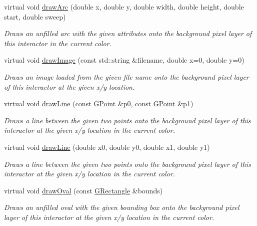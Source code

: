 \begin{DoxyCompactItemize}
virtual void \mbox{\hyperlink{classGDrawingSurface_a38b6fae1045191c57092b49905068144}{draw\+Arc}} (double x, double y, double width, double height, double start, double sweep)
\begin{DoxyCompactList}\small\item\em Draws an unfilled arc with the given attributes onto the background pixel layer of this interactor in the current color. \end{DoxyCompactList}\item 
virtual void \mbox{\hyperlink{classGDrawingSurface_abdd4cb1f2c64adc5d03522a1ee30febf}{draw\+Image}} (const std\+::string \&filename, double x=0, double y=0)
\begin{DoxyCompactList}\small\item\em Draws an image loaded from the given file name onto the background pixel layer of this interactor at the given x/y location. \end{DoxyCompactList}\item 
virtual void \mbox{\hyperlink{classGDrawingSurface_ae6a24b6b9a6e795d3165c1c750d5bdf1}{draw\+Line}} (const \mbox{\hyperlink{classGPoint}{G\+Point}} \&p0, const \mbox{\hyperlink{classGPoint}{G\+Point}} \&p1)
\begin{DoxyCompactList}\small\item\em Draws a line between the given two points onto the background pixel layer of this interactor at the given x/y location in the current color. \end{DoxyCompactList}\item 
virtual void \mbox{\hyperlink{classGDrawingSurface_aff299fe83178d2f3ce8c08c06b583484}{draw\+Line}} (double x0, double y0, double x1, double y1)
\begin{DoxyCompactList}\small\item\em Draws a line between the given two points onto the background pixel layer of this interactor at the given x/y location in the current color. \end{DoxyCompactList}\item 
virtual void \mbox{\hyperlink{classGDrawingSurface_a8adc13027efe311b4a6a715205b8bc46}{draw\+Oval}} (const \mbox{\hyperlink{classGRectangle}{G\+Rectangle}} \&bounds)
\begin{DoxyCompactList}\small\item\em Draws an unfilled oval with the given bounding box onto the background pixel layer of this interactor at the given x/y location in the current color. \end{DoxyCompactList}\item 

\end{DoxyCompactItemize}
